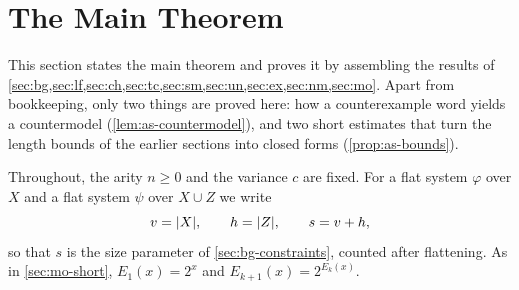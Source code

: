 
\providecommand{\parity}{\operatorname{par}}
\providecommand{\Mod}{\operatorname{Mod}}
\providecommand{\CondI}{\textup{(I0)}}
\providecommand{\CondU}{\textup{(U)}}
\providecommand{\CondII}{\textup{(II)}}
\providecommand{\DeadT}{\mathsf{DeadT}}
\providecommand{\DeadU}{\mathsf{DeadU}}
\providecommand{\Fup}[1]{\Fact^{\uparrow}_{#1}}
\providecommand{\Bsrc}{\mathcal B}
\providecommand{\RU}{\mathcal R_{\mathrm U}}
\providecommand{\Lnm}{\mathsf L_{\mathrm{nm}}}
\providecommand{\Eall}{E_{\mathrm{all}}}
\providecommand{\Ereg}{E_{\mathrm{reg}}}
\providecommand{\Efin}{E_{\mathrm{fin}}}

\section{The Main Theorem}\label{sec:as}

This section states the main theorem and proves it by assembling the results
of \cref{sec:bg,sec:lf,sec:ch,sec:tc,sec:sm,sec:un,sec:ex,sec:nm,sec:mo}.
Apart from bookkeeping, only two things are proved here: how a
counterexample word yields a countermodel (\cref{lem:as-countermodel}), and
two short estimates that turn the length bounds of the earlier sections into
closed forms (\cref{prop:as-bounds}).

Throughout, the arity $n\ge0$ and the variance $c$ are fixed. For a flat
system $\varphi$ over $X$ and a flat system $\psi$ over $X\cup Z$ we write
\[
 v=\lvert X\rvert,\qquad h=\lvert Z\rvert,\qquad s=v+h,
\]
so that $s$ is the size parameter of \cref{sec:bg-constraints}, counted after
flattening. As in \cref{sec:mo-short}, $E_1(x)=2^x$ and
$E_{k+1}(x)=2^{E_k(x)}$.


